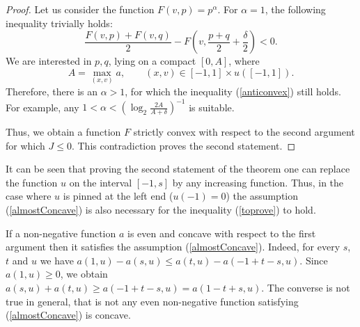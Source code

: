 \begin{proof}
Let us consider the function $F(v, p) = p ^ \alpha$.
For $\alpha = 1$, the following inequality trivially holds:
\begin{equation}
\label{anticonvex}
\frac{F(v, p) + F(v, q)}{ 2 } - F(v, \frac{p + q}{ 2 } + \frac{\delta}{ 2}) <0.
\end{equation}
We are interested in $p, q$, lying on a compact $[0 , A]$,
where 
$$A=\max \limits_{(x, v)} a,\qquad (x, v) \in [-1, 1 ] \times u([-1, 1] ).
$$
Therefore, there is an $\alpha> 1$, for which the inequality (\ref{anticonvex})
still holds.
For example, any $1 < \alpha < (\log_2 \frac{ 2 A}{A + \delta})^{-1}$ is suitable.

Thus, we obtain a function $F$ strictly convex with respect to the second argument
for which $J \le 0$. This contradiction proves the second statement.
\end{proof}

\begin{rem}
\label{landesNecessary}
It can be seen that proving the second statement of the theorem
one can replace the function $u$ on the interval $[-1, s]$ by any increasing function.
Thus, in the case where $u$ is pinned at the left end {\rm ($u(-1) = 0$)}
the assumption (\ref{almostConcave}) is also necessary for the inequality (\ref{toprove}) to hold.
\end{rem}

\begin{rem}
If a  non-negative function $a$ is even and concave with respect to the first argument then it satisfies the assumption (\ref{almostConcave}). 
Indeed, for every $s$, $t$ and $u$ we have $a( 1 , u) - a(s, u) \le a(t, u) - a(-1 + t - s, u)$.
Since $a( 1 , u) \ge 0$, we obtain $a(s, u) + a(t, u) \ge a(-1 + t - s, u) = a( 1 - t + s, u)$.
The converse is not true in general, that is not any even
non-negative function satisfying (\ref{almostConcave}) is concave.
\end{rem}
